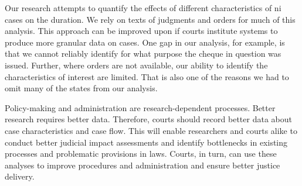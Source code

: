 Our research attempts to quantify the effects of different characteristics of \gls{ni} cases on the duration. We rely on texts of judgments and orders for much of this analysis. This approach can be improved upon if courts institute systems to produce more granular data on cases. One gap in our analysis, for example, is that we cannot reliably identify for what purpose the cheque in question was issued. Further, where orders are not available, our ability to identify the characteristics of interest are limited. That is also one of the reasons we had to omit many of the states from our analysis.

Policy-making and administration are research-dependent processes. Better research requires better data. Therefore, courts should record better data about case characteristics and case flow. This will enable researchers and courts alike to conduct better judicial impact assessments and identify bottlenecks in existing processes and problematic provisions in laws. Courts, in turn, can use these analyses to improve procedures and administration and ensure better justice delivery.

